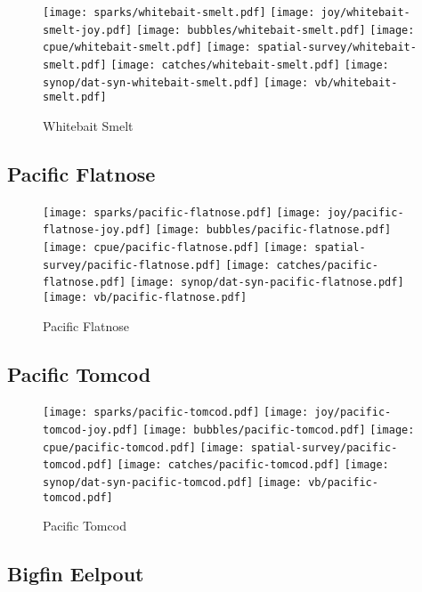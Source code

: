 \begin{figure}[htbp]
\centering
\texttt{[image: sparks/whitebait-smelt.pdf]}
\texttt{[image: joy/whitebait-smelt-joy.pdf]}
\texttt{[image: bubbles/whitebait-smelt.pdf]}
\texttt{[image: cpue/whitebait-smelt.pdf]}
\texttt{[image: spatial-survey/whitebait-smelt.pdf]}
\texttt{[image: catches/whitebait-smelt.pdf]}
\texttt{[image: synop/dat-syn-whitebait-smelt.pdf]}
\texttt{[image: vb/whitebait-smelt.pdf]}
\caption{Whitebait Smelt}
\end{figure}
\clearpage
\subsection*{Pacific Flatnose}

\begin{figure}[htbp]
\centering
\texttt{[image: sparks/pacific-flatnose.pdf]}
\texttt{[image: joy/pacific-flatnose-joy.pdf]}
\texttt{[image: bubbles/pacific-flatnose.pdf]}
\texttt{[image: cpue/pacific-flatnose.pdf]}
\texttt{[image: spatial-survey/pacific-flatnose.pdf]}
\texttt{[image: catches/pacific-flatnose.pdf]}
\texttt{[image: synop/dat-syn-pacific-flatnose.pdf]}
\texttt{[image: vb/pacific-flatnose.pdf]}
\caption{Pacific Flatnose}
\end{figure}
\clearpage
\subsection*{Pacific Tomcod}

\begin{figure}[htbp]
\centering
\texttt{[image: sparks/pacific-tomcod.pdf]}
\texttt{[image: joy/pacific-tomcod-joy.pdf]}
\texttt{[image: bubbles/pacific-tomcod.pdf]}
\texttt{[image: cpue/pacific-tomcod.pdf]}
\texttt{[image: spatial-survey/pacific-tomcod.pdf]}
\texttt{[image: catches/pacific-tomcod.pdf]}
\texttt{[image: synop/dat-syn-pacific-tomcod.pdf]}
\texttt{[image: vb/pacific-tomcod.pdf]}
\caption{Pacific Tomcod}
\end{figure}
\clearpage
\subsection*{Bigfin Eelpout}

